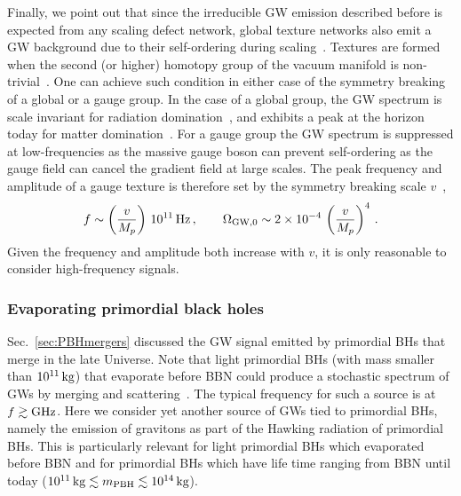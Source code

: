 \documentclass[11pt,a4paper]{article}
\begin{document}
Finally, we point out that since the irreducible GW emission described before is expected from any scaling defect network, global texture networks also emit a GW background due to their self-ordering during scaling~\cite{JonesSmith:2007ne,Fenu:2009qf,Giblin:2011yh,Figueroa:2012kw, Figueroa:2020lvo}. Textures are formed when the second (or higher) homotopy group of the vacuum manifold is non-trivial~\cite{Vilenkin:2000jqa}. One can achieve such condition in either case of the symmetry breaking of a global or a gauge group. In the case of a global group, the GW spectrum is scale invariant for radiation domination~\cite{JonesSmith:2007ne,Fenu:2009qf,Figueroa:2012kw}, and exhibits a peak at the horizon today for matter domination~\cite{Figueroa:2020lvo}. For a gauge group the GW spectrum is suppressed at low-frequencies as the massive gauge boson can prevent self-ordering as the gauge field can cancel the gradient field at large scales. The peak frequency and amplitude of a gauge texture is therefore set by the symmetry breaking scale $v$~\cite{Dror:2019syi},
\begin{equation}
    f \sim  \left(\frac{v}{M_p}\right) \, 10^{11} \, {\rm Hz} \,, \qquad
    \Omega_{\text{GW},0} \sim 2 \times 10^{-4} \, \left(\frac{v}{M_p}\right)^4 \,.
    \label{eq:gaugetextures}
\end{equation}
Given the frequency and amplitude both increase with $v$, it is only reasonable to consider high-frequency signals.


\subsubsection{Evaporating primordial black holes}
\label{sec:EvaporatingPBHs}

Sec.~\ref{sec:PBHmergers} discussed the GW signal emitted by primordial BHs that merge in the late Universe. Note that light primordial BHs (with mass smaller than $10^{11} \, {\rm kg}$) that evaporate before BBN could produce a stochastic spectrum of GWs by merging and scattering~\cite{Dolgov:2011cq}. The typical frequency for such a source is at $f \gtrsim \rm{GHz}$. Here we consider yet another source of GWs tied to primordial BHs, namely the emission of gravitons as part of the Hawking radiation of primordial BHs. This is particularly relevant for light primordial BHs which evaporated before BBN  and for primordial BHs which have life time ranging from BBN until today ($10^{11} \, {\rm kg} \lesssim m_{\rm PBH} \lesssim 10^{14} \, {\rm kg}$).
\end{document}
